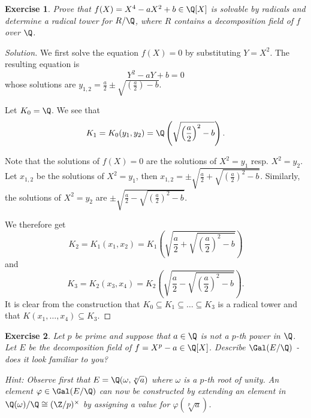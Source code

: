 \documentclass[a4paper,10pt,reqno]{amsart}
\newtheorem{ex}{Exercise}[section]
\newenvironment{sol}
  {\renewcommand\qedsymbol{$\blacksquare$}\begin{proof}[Solution]}
  {\end{proof}}
\begin{document}
\begin{ex}
\label{11.1}
    Prove that $f(X)=X^4-aX^2+b\in \Q[X]$ is solvable by radicals
    and determine a radical tower for $R/\Q$,
    where $R$ contains a decomposition field of $f$ over $\Q$.
\end{ex}

\begin{sol}
    We first solve the equation $f(X) = 0$ by substituting $Y = X^2$. The resulting equation is
    \[
    Y^2 - aY + b = 0
    \]
    whose solutions are $y_{1,2} = \frac{a}{2} \pm \sqrt{\left(\frac{a}{2}\right) - b}$.
    
    Let $K_0 = \Q$. We see that
    \[
    K_1 = K_0(y_1,y_2) = \Q\left( \sqrt{\left(\frac{a}{2}\right)^2 - b} \right).
    \]

    Note that the solutions of $f(X) = 0$ are the solutions of $X^2 = y_1$ resp. $X^2 = y_2$. Let $x_{1,2}$ be the solutions of $X^2 = y_1$, then $x_{1,2} = \pm \sqrt{\frac{a}{2} + \sqrt{\left(\frac{a}{2}\right)^2 - b}}$. Similarly, the solutions of $X^2 = y_2$ are $ \pm \sqrt{\frac{a}{2} - \sqrt{\left(\frac{a}{2}\right)^2 - b}}$.

    We therefore get
    \[
    K_2 = K_1(x_1,x_2) = K_1\left( \sqrt{\frac{a}{2} + \sqrt{\left(\frac{a}{2}\right)^2 - b}} \right)
    \]
    and
    \[
    K_3 = K_2(x_3,x_4) = K_2\left( \sqrt{\frac{a}{2} - \sqrt{\left(\frac{a}{2}\right)^2 - b}} \right).
    \]
    It is clear from the construction that $K_0 \subseteq K_1 \subseteq \ldots \subseteq K_3$ is a radical tower and that $K(x_1,\ldots,x_4) \subseteq K_3$.  
\end{sol}



\begin{ex}
\label{11.2}
    Let $p$ be prime and suppose that $a \in \Q$ is \emph{not} a $p$-th power in $\Q$. Let $E$ be the decomposition field of $f = X^p-a \in \Q[X]$. Describe $\Gal(E/\Q)$ - does it look familiar to you?

    \noindent \textit{Hint:} Observe first that $E = \Q(\omega,\sqrt[p]{a})$ where $\omega$ is a $p$-th root of unity. An element $\varphi \in \Gal(E/\Q)$ can now be constructed by extending an element in $\Q(\omega)/\Q \cong (\Z/p)^{\times}$ by assigning a value for $\varphi(\sqrt[p]{a})$.
\end{ex}
\end{document}
